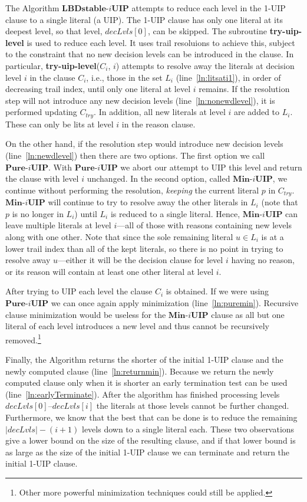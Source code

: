 \documentclass[runningheads]{llncs}
\newcommand{\IUIP}{\textbf{LBDstable-$i$UIP}}
\newcommand{\tryuiplevel}{\textbf{try-uip-level}\xspace}
\newcommand{\IUIPPURE}{\textbf{Pure-$i$UIP}}
\newcommand{\IUIPMIN}{\textbf{Min-$i$UIP}}
\newcommand{\dlevels}{\ensuremath{\mathit{decLvls}}}
\newcommand{\ctry}{C_{\mathit{try}}}
\begin{document}
The Algorithm $\IUIP$ attempts to reduce each level in the 1-UIP
clause to a single literal (a UIP). The 1-UIP clause  has only
one literal at its deepest level, so that level, $\dlevels[0]$, can be
skipped. The subroutine \tryuiplevel is used to reduce each level. It
uses trail resoluions to achieve this, subject to the constraint that
no new decision levels can be introduced in the clause. In particular,
\tryuiplevel($C_i$, $i$) attempts to resolve away the literals at
decision level $i$ in the clause $C_i$, i.e., those in the set $L_i$
(line~\ref{ln:litsati1}), in order of decreasing trail index, until only
one literal at level $i$ remains. If the resolution step will not
introduce any new decision levels (line~\ref{ln:nonewdlevel}), it is
performed updating $\ctry$. In addition, all new literals at level $i$
are added to $L_i$. These can only be lits at level $i$ in the reason
clause.

On the other hand, if the resolution step would introduce new decision
levels (line~\ref{ln:newdlevel}) then there are two options.  The
first option we call $\IUIPPURE$. With $\IUIPPURE$ we abort our
attempt to UIP this level and return the clause with level $i$
unchanged. In the second option, called $\IUIPMIN$, we continue
without performing the resolution, \textit{keeping} the current
literal $p$ in $\ctry$. $\IUIPMIN$ will continue to try to resolve
away the other literals in $L_i$ (note that $p$ is no longer in $L_i$)
until $L_i$ is reduced to a single literal. Hence, $\IUIPMIN$ can
leave multiple literals at level $i$---all of those with reasons
containing new levels along with one other. Note that since the sole
remaining literal $u\in L_i$ is at a lower trail index than all of the
kept literals, so there is no point in trying to resolve away
$u$---either it will be the decision clause for level $i$ having no
reason, or its reason will contain at least one other literal at level
$i$.

After trying to UIP each level the clause $C_i$ is obtained. If we
were using $\IUIPPURE$ we can once again apply minimization
(line~\ref{ln:puremin}). Recursive clause minimization
\cite{DBLP:conf/sat/SorenssonB09} would be useless for the $\IUIPMIN$
clause as all but one literal of each level introduces a new level and
thus cannot be recursively removed.\footnote{Other more powerful
  minimization techniques could still be applied.} 

Finally, the Algorithm returns the shorter of the initial 1-UIP clause
and the newly computed clause (line~\ref{ln:returnmin}). Because we
return the newly computed clause only when it is shorter an early
termination test can be used (line~\ref{ln:earlyTerminate}). After the
algorithm has finished processing levels $\dlevels[0]$--$\dlevels[i]$
the literals at those levels cannot be further changed. Furthermore,
we know that the best that can be done is to reduce the remaining
$|\dlevels| - (i+1)$ levels down to a single literal each. These two
observations give a lower bound on the size of the resulting clause,
and if that lower bound is as large as the size of the initial 1-UIP
clause we can terminate and return the initial 1-UIP clause.
\end{document}
